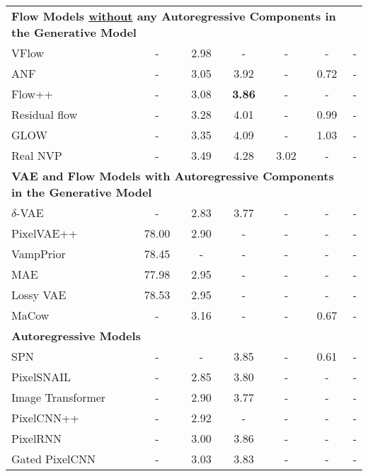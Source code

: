 \documentclass{article}
\begin{document}
\begin{table*}
{\begin{tabular}{lcccccc}
        \multicolumn{6}{l}{\bf Flow Models \underline{without} any Autoregressive Components in the Generative Model} \\
        VFlow~\cite{chen2020vflow}             & - & 2.98 & - & - & -  & - \\
        ANF~\cite{huang2020anf}                & - & 3.05 & 3.92 & - & 0.72 & - \\
        Flow++~\cite{ho19flow++}    & - & 3.08 & \bf 3.86 & -    & - & - \\
        Residual flow~\cite{chen2019residualflows}      & - & 3.28 & 4.01 & - & 0.99 & -  \\
        GLOW~\cite{kingma2018glow}               & - & 3.35 & 4.09 & - & 1.03 & - \\
        Real NVP~\cite{dinh2016realnvp}           & - & 3.49 & 4.28 & 3.02 & -    & - \\
        \midrule
        \midrule
        \multicolumn{6}{l}{\bf VAE and Flow Models with Autoregressive Components in the Generative Model} \\
        $\delta$-VAE~\cite{razavi2019collapse} & - & 2.83  & 3.77  & - & - & -\\
        PixelVAE++~\cite{sadeghi2019pixelvae++}
                          & 78.00 & 2.90  & -  & - & - & -\\
        VampPrior~\cite{tomczak2018VampPrior}         & 78.45 & - & - & - & - & - \\
        MAE~\cite{ma2019mae}               & 77.98 & 2.95 & - & - & - & -\\
        Lossy VAE~\cite{chen2016lossy}         & 78.53 & 2.95 & - & - & -  & -\\
        MaCow~\cite{ma19MaCow}             & - & 3.16 & - & - & 0.67 & - \\
        \midrule
        \multicolumn{6}{l}{\bf Autoregressive Models} \\
        SPN~\cite{menick2018spn}                & - & - & 3.85 & - & 0.61 & - \\
        PixelSNAIL~\cite{chen2018pixelsnail}         & - & 2.85 & 3.80 & - & - & - \\
        Image Transformer~\cite{parmar2018image}  & - & 2.90 & 3.77 & - & - & -\\
        PixelCNN++~\cite{salimans2017pixelcnn++}         & - & 2.92 & - & - & - & -\\
        PixelRNN~\cite{van2016pixel}           & - & 3.00 & 3.86 & - & - & -\\
        Gated PixelCNN~\cite{van2016conditional}     & - & 3.03 & 3.83 & - & - & -\\
        \bottomrule
        
        
    \end{tabular}}
\end{table*}
 
\end{document}
